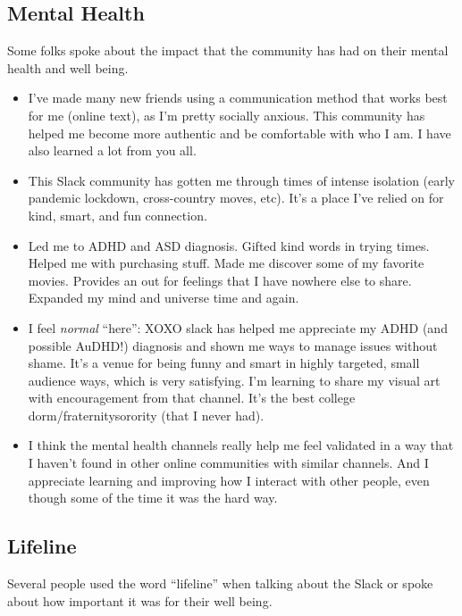 \documentclass[
]{book}
\providecommand{\tightlist}{%
  \setlength{\itemsep}{0pt}\setlength{\parskip}{0pt}}
\begin{document}
\subsection{Mental Health}\label{mental-health}

Some folks spoke about the impact that the community has had on their mental health and well being.

\begin{itemize}
\tightlist
\item
  I've made many new friends using a communication method that works best for me (online text), as I'm pretty socially anxious. This community has helped me become more authentic and be comfortable with who I am. I have also learned a lot from you all.
\item
  This Slack community has gotten me through times of intense isolation (early pandemic lockdown, cross-country moves, etc). It's a place I've relied on for kind, smart, and fun connection.
\item
  Led me to ADHD and ASD diagnosis. Gifted kind words in trying times. Helped me with purchasing stuff. Made me discover some of my favorite movies. Provides an out for feelings that I have nowhere else to share. Expanded my mind and universe time and again.
\item
  I feel \emph{normal} ``here'': XOXO slack has helped me appreciate my ADHD (and possible AuDHD!) diagnosis and shown me ways to manage issues without shame. It's a venue for being funny and smart in highly targeted, small audience ways, which is very satisfying. I'm learning to share my visual art with encouragement from that channel. It's the best college dorm/fraternity\textbar sorority (that I never had).
\item
  I think the mental health channels really help me feel validated in a way that I haven't found in other online communities with similar channels. And I appreciate learning and improving how I interact with other people, even though some of the time it was the hard way.
\end{itemize}

\subsection{Lifeline}\label{lifeline}

Several people used the word ``lifeline'' when talking about the Slack or spoke about how important it was for their well being.
\end{document}
